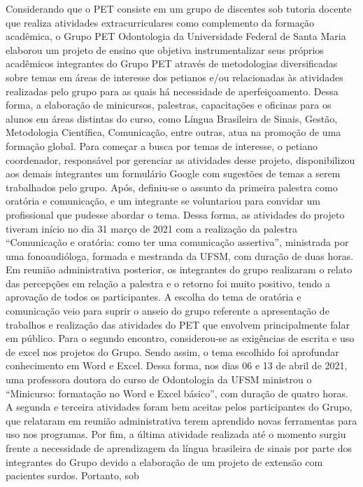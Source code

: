 Considerando que o PET consiste em um grupo de discentes sob tutoria docente que realiza 
atividades extracurriculares como complemento da formação acadêmica, o Grupo PET 
Odontologia da Universidade Federal de Santa Maria elaborou um projeto de ensino que objetiva 
instrumentalizar seus próprios acadêmicos integrantes do Grupo PET através de metodologias 
diversificadas sobre temas em áreas de interesse dos petianos e/ou relacionadas às atividades 
realizadas pelo grupo para as quais há necessidade de aperfeiçoamento. Dessa forma, a elaboração 
de minicursos, palestras, capacitações e oficinas para os alunos em áreas distintas do curso, como 
Língua Brasileira de Sinais, Gestão, Metodologia Científica, Comunicação, entre outras, atua na 
promoção de uma formação global. Para começar a busca por temas de interesse, o petiano 
coordenador, responsável por gerenciar as atividades desse projeto, disponibilizou aos demais 
integrantes um formulário Google com sugestões de temas a serem trabalhados pelo grupo. Após, 
definiu-se o assunto da primeira palestra como oratória e comunicação, e um integrante se 
voluntariou para convidar um profissional que pudesse abordar o tema. Dessa forma, as atividades 
do projeto tiveram início no dia 31 março de 2021 com a realização da palestra “Comunicação e 
oratória: como ter uma comunicação assertiva”, ministrada por uma fonoaudióloga, formada e 
mestranda da UFSM, com duração de duas horas. Em reunião administrativa posterior, os 
integrantes do grupo realizaram o relato das percepções em relação a palestra e o retorno foi muito 
positivo, tendo a aprovação de todos os participantes. A escolha do tema de oratória e comunicação 
veio para suprir o anseio do grupo referente a apresentação de trabalhos e realização das atividades 
do PET que envolvem principalmente falar em público. Para o segundo encontro, considerou-se 
as exigências de escrita e uso de excel nos projetos do Grupo. Sendo assim, o tema escolhido foi 
aprofundar conhecimento em Word e Excel. Dessa forma, nos dias 06 e 13 de abril de 2021, uma 
professora doutora do curso de Odontologia da UFSM ministrou o “Minicurso: formatação no 
Word e Excel básico”, com duração de quatro horas. A segunda e terceira atividades foram bem 
aceitas pelos participantes do Grupo, que relataram em reunião administrativa terem aprendido 
novas ferramentas para uso nos programas. Por fim, a última atividade realizada até o momento 
surgiu frente a necessidade de aprendizagem da língua brasileira de sinais por parte dos integrantes 
do Grupo devido a elaboração de um projeto de extensão com pacientes surdos. Portanto, sob 
